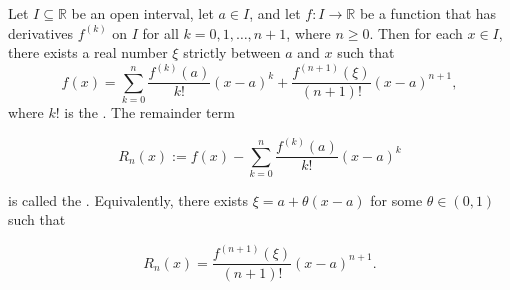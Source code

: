 \begin{theorem} \label{theorem:taylor_formula_with_lagrange_remainder_for_real_functions_that_are_n_plus_one_times_differentiable_at_a_point}
    Let $I \subseteq \mathbb{R}$ be an open interval, let $a \in I$, and let $f : I \to \mathbb{R}$ be a function that has derivatives $f^{(k)}$ on $I$ for all $k = 0, 1, \dots, n+1$, where $n \geq 0$. Then for each $x \in I$, there exists a real number $\xi$ strictly between $a$ and $x$ such that
    $$f(x) = \sum_{k=0}^n \frac{f^{(k)}(a)}{k!}(x - a)^k + \frac{f^{(n+1)}(\xi)}{(n+1)!}(x - a)^{n+1},$$
    where $k!$ is the . The remainder term

    $$R_n(x) := f(x) - \sum_{k=0}^n \frac{f^{(k)}(a)}{k!}(x - a)^k$$

    is called the . Equivalently, there exists $\xi = a + \theta(x-a)$ for some $\theta \in (0, 1)$ such that

    $$R_n(x) = \frac{f^{(n+1)}(\xi)}{(n+1)!}(x - a)^{n+1}.$$
\end{theorem}


